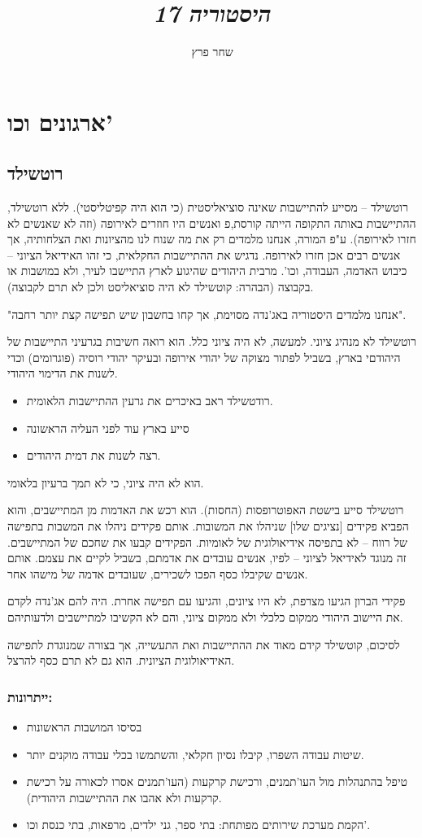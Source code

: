 \documentclass[]{article}
\author{שחר פרץ}
\title{\textit{היסטוריה 17}}
\begin{document}
	\maketitle
	\section{ארגונים וכו'}
	\subsection{רוטשילד}
	רוטשילד – מסייע להתיישבות שאינה סוציאליסטית (כי הוא היה קפיטליסטי). ללא רוטשילד, ההתיישבות באותה התקופה הייתה קורסת,פ ואנשים היו חוזרים לאירופה (וזה לא שאנשים לא חזרו לאירופה). ע"פ המורה, אנחנו מלמדים רק את מה שנוח לנו מהציונות ואת הצלחותיה, אך אנשים רבים אכן חזרו לאירופה. נדגיש את ההתיישבות החקלאית, כי זהו האידיאל הציוני – כיבוש האדמה, העבודה, וכו'. מרבית היהודים שהיגוע לארץ התיישבו לעיר, ולא במושבות או בקבוצה (הבהרה: קוטשילד לא היה סוציאליסט ולכן לא תרם לקבוצה). 
	
	"אנחנו מלמדים היסטוריה באג'נדה מסוימת, אך קחו בחשבון שיש תפישה קצת יותר רחבה". 
	
	רוטשילד לא מנהיג ציוני. למעשה, לא היה ציוני כלל. הוא רואה חשיבות בגרעיני התיישבות של היהודםי בארץ, בשביל לפתור מצוקה של יהודי אירופה ובעיקר יהודי רוסיה (פוגרומים) וכדי לשנות את הדימוי היהודי. 
	\begin{itemize}
		\item רודטשילד ראב באיכרים את גרעין ההתיישבות הלאומית. 
		\item סייע בארץ עוד לפני העליה הראשונה
		\item רצה לשנות את דמית היהודים. 
	\end{itemize}
	הוא לא היה ציוני, כי לא תמך ברעיון בלאומי. 
	
	רוטשילד סייע בישטת האפוטרופסות (החסות). הוא רכש את האדמות מן המתיישבים, והוא הפביא פקידים [נציגים שלו] שניהלו את המשובות. אותם פקידים ניהלו את המשבות בתפישה של רווח – לא בתפיסה אידיאולוגית של לאומיות. הפקידים קבעו את שחכם של המתיישבים. זה מנוגד לאידיאל לציוני – לפיו, אנשים עובדים את אדמתם, בשביל לקיים את עצמם. אותם אנשים שקיבלו כסף הפכו לשכירים, שעובדים אדמה של מישהו אחר. 
	
	פקידי הברון הגיעו מצרפת, לא היו ציונים, והגיעו עם תפישה אחרת. היה להם אג'נדה לקדם את היישוב היהודי ממקום כלכלי ולא ממקום ציוני, והם לא הקשיבו למתיישבים ולדעותיהם. 
	
	לסיכום, קוטשילד קידם מאוד את ההתיישבות ואת התעשייה, אך בצורה שמנוגדת לתפישה האידיאולוגית הציונית. הוא גם לא תרם כסף להרצל. 
	\subsubsection{ייתרונות: }
	\begin{itemize}
		\item בסיסו המושבות הראשונות
		\item שיטות עבודה השפרו, קיבלו נסיון חקלאי, והשתמשו בכלי עבודה מוקנים יותר. 
		\item טיפל בהתנהלות מול העו'תמנים, ורכישת קרקעות (העו'תמנים אסרו לכאורה על רכישת קרקעות ולא אהבו את ההתיישבות היהודית). 
		\item הקמת מערכת שירותים מפותחת: בתי ספר, גני ילדים, מרפאות, בתי כנסת וכו'. 
	\end{itemize}
	
\end{document}
